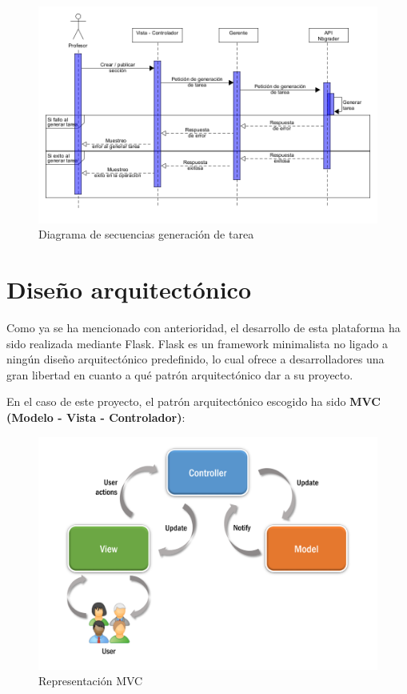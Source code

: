 \begin{figure}[H]
    \hspace*{-2cm} 
    \includegraphics[scale=0.5]{img/imgs-memoria/Secuencias_Generate.png}
    \caption{Diagrama de secuencias generación de tarea}
\end{figure}


\section{Diseño arquitectónico}
Como ya se ha mencionado con anterioridad, el desarrollo de esta plataforma ha sido realizada mediante Flask. Flask es un framework minimalista no ligado a ningún diseño arquitectónico predefinido, lo cual ofrece a desarrolladores una gran libertad en cuanto a qué patrón arquitectónico dar a su proyecto.

En el caso de este proyecto, el patrón arquitectónico escogido ha sido \textbf{MVC (Modelo - Vista - Controlador)}:

\begin{figure}[H]
    \centering
    \includegraphics[scale=0.4]{img/imgs-memoria/MVC.png}
    \caption{Representación MVC}
\end{figure}

